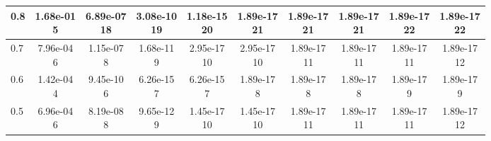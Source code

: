 \begin{table}[H]
\begin{tabular}{|l||c|c|c|c|c|c|c|c|c|}
\hline
 0.8 & \makecell{1.68e-01 \\ 5} & \makecell{6.89e-07 \\ 18} & \makecell{3.08e-10 \\ 19} & \makecell{1.18e-15 \\ 20} & \makecell{1.89e-17 \\ 21} & \makecell{1.89e-17 \\ 21} & \makecell{1.89e-17 \\ 21} & \makecell{1.89e-17 \\ 22} & \makecell{1.89e-17 \\ 22} \\
\hline
 0.7 & \makecell{7.96e-04 \\ 6} & \makecell{1.15e-07 \\ 8} & \makecell{1.68e-11 \\ 9} & \makecell{2.95e-17 \\ 10} & \makecell{2.95e-17 \\ 10} & \makecell{1.89e-17 \\ 11} & \makecell{1.89e-17 \\ 11} & \makecell{1.89e-17 \\ 11} & \makecell{1.89e-17 \\ 12} \\
\hline
 0.6 & \makecell{1.42e-04 \\ 4} & \makecell{9.45e-10 \\ 6} & \makecell{6.26e-15 \\ 7} & \makecell{6.26e-15 \\ 7} & \makecell{1.89e-17 \\ 8} & \makecell{1.89e-17 \\ 8} & \makecell{1.89e-17 \\ 8} & \makecell{1.89e-17 \\ 9} & \makecell{1.89e-17 \\ 9} \\
\hline
 0.5 & \makecell{6.96e-04 \\ 6} & \makecell{8.19e-08 \\ 8} & \makecell{9.65e-12 \\ 9} & \makecell{1.45e-17 \\ 10} & \makecell{1.45e-17 \\ 10} & \makecell{1.89e-17 \\ 11} & \makecell{1.89e-17 \\ 11} & \makecell{1.89e-17 \\ 11} & \makecell{1.89e-17 \\ 12} \\

\end{tabular}
\end{table}
